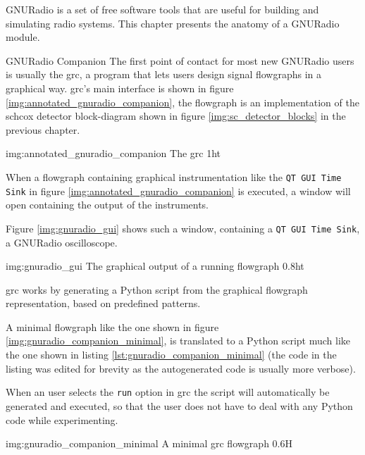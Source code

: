 GNURadio \cite{gnuradioweb} is a set of free software \cite{fsffreeweb}
tools that are useful for building and simulating radio systems.
This chapter presents the anatomy of a GNURadio module.

\begin{subchapter}{GNURadio Companion}
  The first point of contact for most new GNURadio users
  is usually the \gls{grc}, a program that lets
  users design signal flowgraphs in a graphical way.
  \Gls{grc}'s main interface is shown in figure
  \ref{img:annotated_gnuradio_companion}, the flowgraph
  is an implementation of the \acrlong{schcox} detector block-diagram
  shown in figure \ref{img:sc_detector_blocks} in the previous
  chapter.

               {img:annotated_gnuradio_companion}
               {The \acrlong{grc}}
               {1}{ht}

  When a flowgraph containing graphical instrumentation like
  the \texttt{QT GUI Time Sink} in figure \ref{img:annotated_gnuradio_companion}
  is executed, a window will open containing the output of
  the instruments.

  Figure \ref{img:gnuradio_gui} shows such a window, containing
  a \texttt{QT GUI Time Sink}, a GNURadio oscilloscope.

                  {img:gnuradio_gui}
                  {The graphical output of a running flowgraph}
                  {0.8}{ht}

  \Gls{grc} works by generating a Python script from the
  graphical flowgraph representation, based on predefined
  patterns.

  A minimal flowgraph like the one shown in figure
  \ref{img:gnuradio_companion_minimal}, is translated
  to a Python script much like the one shown in
  listing \ref{lst:gnuradio_companion_minimal}
  (the code in the listing was edited for brevity
  as the autogenerated code is usually more verbose).

  When an user selects the \texttt{run} option in \gls{grc}
  the script will automatically be generated and executed,
  so that the user does not have to deal with any Python
  code while experimenting.

                  {img:gnuradio_companion_minimal}
                  {A minimal \gls{grc} flowgraph}
                  {0.6}{H}
\end{subchapter}

